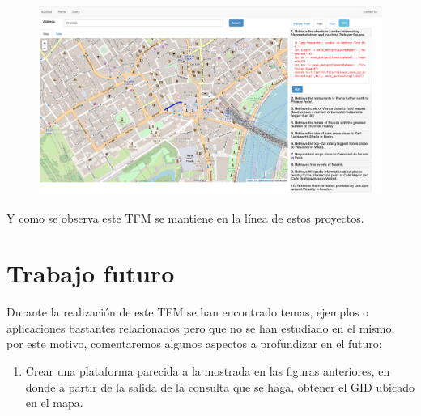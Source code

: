 \begin{figure}
	\centering
	\includegraphics[width=0.7\linewidth]{imagenes/capitulo6/3}
	\caption{}
	\label{fig:3-6}
\end{figure}


Y como se observa este TFM se mantiene en la línea de estos proyectos.

\section{Trabajo futuro}

Durante la realización de este TFM se han encontrado temas, ejemplos o aplicaciones bastantes relacionados pero que no se han estudiado en el mismo, por este motivo, comentaremos algunos aspectos a profundizar en el futuro:

\begin{enumerate}
	
	\item Crear una plataforma parecida a la mostrada en las figuras anteriores, en donde a partir de la salida de la consulta que se haga, obtener el GID ubicado en el mapa.
	
\end{enumerate}




